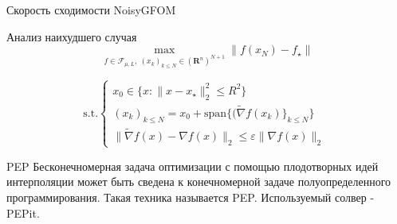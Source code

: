 \documentclass{beamer}
\begin{document}
\begin{frame}{Скорость сходимости NoisyGFOM}
\begin{block}{Анализ наихудшего случая}
\[\max_{f \in \mathcal{F}_{\mu, L}, \ (x_k)_{k \le N} \in (\mathbf{R}^n)^{N+1}} \|f(x_N) - f_{\star}\|\]

    \[\text{s.t.} 
    \begin{cases}
    x_0 \in \{x: \|x-x_{\star}\|_2^2 
    \le R^2\} \\
    (x_k)_{k \le N} = x_0 + \text{span} \{ (\widetilde{\nabla} f(x_{k})\}_{k \le N} \} \\
    \|\widetilde{\nabla} f(x) - \nabla f(x)\|_2 \leq \varepsilon\|\nabla f(x)\|_2 \
\end{cases}\]
\end{block}

\begin{block}{PEP}
    Бесконечномерная задача оптимизации с помощью плодотворных идей интерполяции может быть сведена к конечномерной задаче полуопределенного программирования. Такая техника называется PEP. Используемый солвер - PEPit.
\end{block}

\end{frame}

\end{document}
